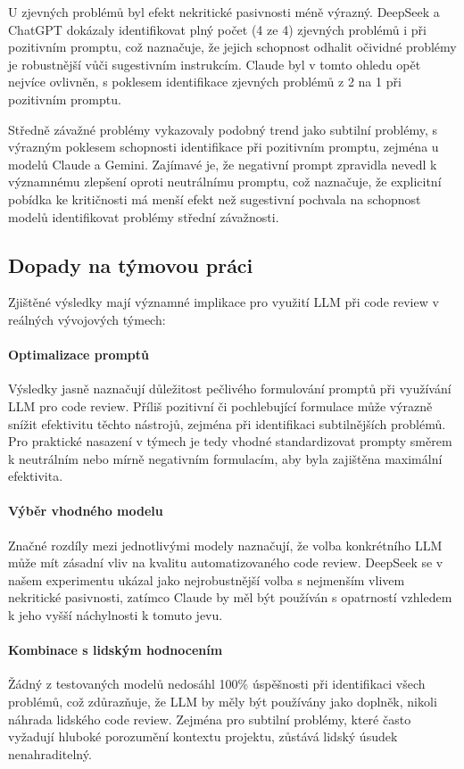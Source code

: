 \documentclass[12pt, a4paper]{article}
\begin{document}
U zjevných problémů byl efekt nekritické pasivnosti méně výrazný. DeepSeek a ChatGPT dokázaly identifikovat plný počet (4 ze 4) zjevných problémů i při pozitivním promptu, což naznačuje, že jejich schopnost odhalit očividné problémy je robustnější vůči sugestivním instrukcím. Claude byl v tomto ohledu opět nejvíce ovlivněn, s poklesem identifikace zjevných problémů z 2 na 1 při pozitivním promptu.

Středně závažné problémy vykazovaly podobný trend jako subtilní problémy, s výrazným poklesem schopnosti identifikace při pozitivním promptu, zejména u modelů Claude a Gemini. Zajímavé je, že negativní prompt zpravidla nevedl k významnému zlepšení oproti neutrálnímu promptu, což naznačuje, že explicitní pobídka ke kritičnosti má menší efekt než sugestivní pochvala na schopnost modelů identifikovat problémy střední závažnosti.

\subsection{Dopady na týmovou práci}
Zjištěné výsledky mají významné implikace pro využití LLM při code review v reálných vývojových týmech:

\paragraph{Optimalizace promptů} Výsledky jasně naznačují důležitost pečlivého formulování promptů při využívání LLM pro code review. Příliš pozitivní či pochlebující formulace může výrazně snížit efektivitu těchto nástrojů, zejména při identifikaci subtilnějších problémů. Pro praktické nasazení v týmech je tedy vhodné standardizovat prompty směrem k neutrálním nebo mírně negativním formulacím, aby byla zajištěna maximální efektivita.

\paragraph{Výběr vhodného modelu} Značné rozdíly mezi jednotlivými modely naznačují, že volba konkrétního LLM může mít zásadní vliv na kvalitu automatizovaného code review. DeepSeek se v našem experimentu ukázal jako nejrobustnější volba s nejmenším vlivem nekritické pasivnosti, zatímco Claude by měl být používán s opatrností vzhledem k jeho vyšší náchylnosti k tomuto jevu.

\paragraph{Kombinace s lidským hodnocením} Žádný z testovaných modelů nedosáhl 100\% úspěšnosti při identifikaci všech problémů, což zdůrazňuje, že LLM by měly být používány jako doplněk, nikoli náhrada lidského code review. Zejména pro subtilní problémy, které často vyžadují hluboké porozumění kontextu projektu, zůstává lidský úsudek nenahraditelný.
\end{document}
